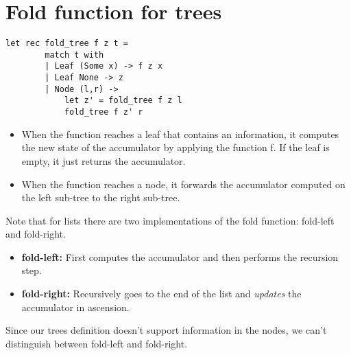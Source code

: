 \section{Fold function for trees}
\begin{lstlisting}[style = FSharpStyle]
    let rec fold_tree f z t =
        match t with
        | Leaf (Some x) -> f z x
        | Leaf None -> z
        | Node (l,r) ->
            let z' = fold_tree f z l
            fold_tree f z' r
\end{lstlisting}
\begin{itemize}
    \item When the function reaches a leaf that contains an information, it computes the new state of the accumulator by applying the function f. If the leaf is empty, it just returns the accumulator.
    \item When the function reaches a node, it forwards the accumulator computed on the left sub-tree to the right sub-tree.
\end{itemize}
Note that for lists there are two implementations of the fold function: fold-left and fold-right.
\begin{itemize}
    \item \textbf{fold-left: }First computes the accumulator and then performs the recursion step.
    \item \textbf{fold-right: }Recursively goes to the end of the list and \textit{updates} the accumulator in ascension.
\end{itemize}
Since our trees definition doesn't support information in the nodes, we can't distinguish between fold-left and fold-right.
